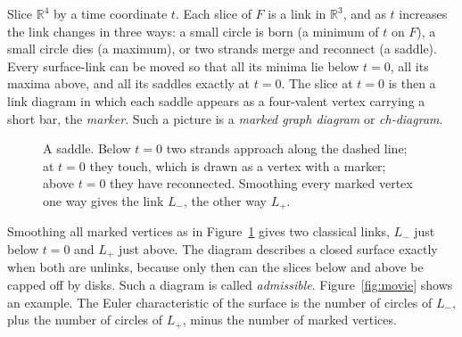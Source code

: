 \documentclass[11pt]{amsart}
\theoremstyle{plain}
\theoremstyle{remark}
\begin{document}
Slice $\mathbb{R}^4$ by a time coordinate $t$. Each slice of $F$ is a link in $\mathbb{R}^3$, and as $t$
increases the link changes in three ways: a small circle is born (a minimum of $t$ on $F$), a small circle
dies (a maximum), or two strands merge and reconnect (a saddle). Every surface-link can be moved so that
all its minima lie below $t=0$, all its maxima above, and all its saddles exactly at $t=0$. The slice at
$t=0$ is then a link diagram in which each saddle appears as a four-valent vertex carrying a short bar,
the \emph{marker}. Such a picture is a \emph{marked graph diagram} or \emph{ch-diagram}.

\begin{figure}[ht]
\centering
{}
\caption{A saddle. Below $t=0$ two strands approach along the dashed line; at $t=0$ they touch, which is
drawn as a vertex with a marker; above $t=0$ they have reconnected. Smoothing every marked vertex one way
gives the link $L_-$, the other way $L_+$.}
\label{fig:vertex}
\end{figure}

Smoothing all marked vertices as in Figure~\ref{fig:vertex} gives two classical links, $L_-$ just below
$t=0$ and $L_+$ just above. The diagram describes a closed surface exactly when both are unlinks, because
only then can the slices below and above be capped off by disks. Such a diagram is called
\emph{admissible}. Figure~\ref{fig:movie} shows an example. The Euler characteristic of the surface is
the number of circles of $L_-$, plus the number of circles of $L_+$, minus the number of marked vertices.
\end{document}
